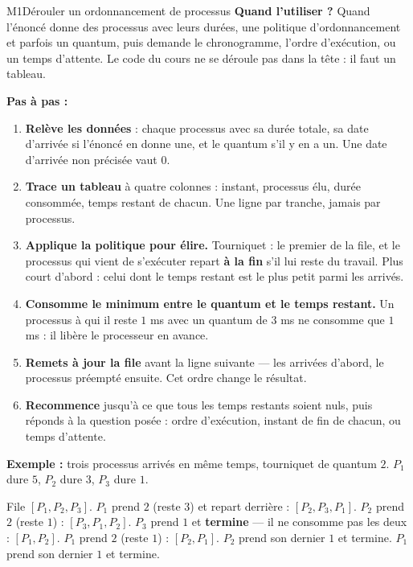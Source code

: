 \begin{fichemethode}{M1}{Dérouler un ordonnancement de processus}
\textbf{Quand l'utiliser ?} Quand l'énoncé donne des processus avec leurs durées, une politique
d'ordonnancement et parfois un quantum, puis demande le chronogramme, l'ordre d'exécution, ou
un temps d'attente. Le code du cours ne se déroule pas dans la tête : il faut un tableau.

\textbf{Pas à pas :}
\begin{enumerate}
  \item \textbf{Relève les données} : chaque processus avec sa durée totale, sa date d'arrivée
    si l'énoncé en donne une, et le quantum s'il y en a un. Une date d'arrivée non précisée
    vaut $0$.
  \item \textbf{Trace un tableau} à quatre colonnes : instant, processus élu, durée
    consommée, temps restant de chacun. Une ligne par tranche, jamais par processus.
  \item \textbf{Applique la politique pour élire.} Tourniquet : le premier de la file, et le
    processus qui vient de s'exécuter repart \textbf{à la fin} s'il lui reste du travail.
    Plus court d'abord : celui dont le temps restant est le plus petit parmi les arrivés.
  \item \textbf{Consomme le minimum entre le quantum et le temps restant.} Un processus à qui
    il reste $1$ ms avec un quantum de $3$ ms ne consomme que $1$ ms : il libère le
    processeur en avance.
  \item \textbf{Remets à jour la file} avant la ligne suivante — les arrivées d'abord, le
    processus préempté ensuite. Cet ordre change le résultat.
  \item \textbf{Recommence} jusqu'à ce que tous les temps restants soient nuls, puis réponds à
    la question posée : ordre d'exécution, instant de fin de chacun, ou temps d'attente.
\end{enumerate}

\textbf{Exemple :} trois processus arrivés en même temps, tourniquet de quantum $2$.
$P_1$ dure $5$, $P_2$ dure $3$, $P_3$ dure $1$.

File $[P_1, P_2, P_3]$. $P_1$ prend $2$ (reste $3$) et repart derrière : $[P_2, P_3, P_1]$.
$P_2$ prend $2$ (reste $1$) : $[P_3, P_1, P_2]$. $P_3$ prend $1$ et \textbf{termine} — il ne
consomme pas les deux : $[P_1, P_2]$. $P_1$ prend $2$ (reste $1$) : $[P_2, P_1]$. $P_2$ prend
son dernier $1$ et termine. $P_1$ prend son dernier $1$ et termine.


\end{fichemethode}
